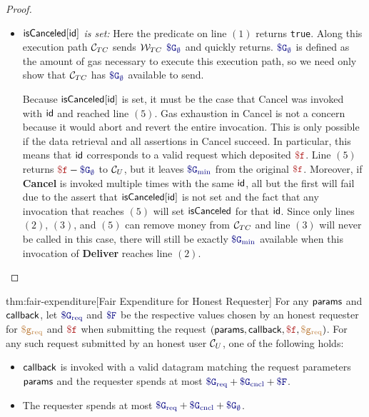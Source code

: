 \begin{proof}
\begin{itemize}
\item {\it ${\sf isCanceled}[{\sf id}]$ is set:}
Here the predicate on line $(1)$ returns {\tt true}.
Along this execution path $\tcont$ sends $\tcadd$ $\constgascancel$ and quickly returns.
$\constgascancel$ is defined as the amount of gas necessary to execute this execution path,
so we need only show that $\tcont$ has $\constgascancel$ available to send.

Because ${\sf isCanceled}[{\sf id}]$ is set, it must be the case that {\sf Cancel} was invoked with ${\sf id}$ and reached line $(5)$.
Gas exhaustion in {\sf Cancel} is not a concern because it would abort and revert the entire invocation.
This is only possible if the data retrieval and all assertions in {\sf Cancel} succeed.
In particular, this means that ${\sf id}$ corresponds to a valid request which deposited $\fee$.
Line $(5)$ returns $\fee - \constgascancel$ to $\reqcont$, but it leaves $\constgasmin$ from the original $\fee$.
Moreover, if {\bf Cancel} is invoked multiple times with the same ${\sf id}$, all but the first will fail due to the assert that ${\sf isCanceled}[{\sf id}]$ is not set
and the fact that any invocation that reaches $(5)$ will set ${\sf isCanceled}$ for that ${\sf id}$.
Since only lines $(2)$, $(3)$, and $(5)$ can remove money from $\tcont$ and line $(3)$ will never be called in this case,
there will still be exactly $\constgasmin$ available when this invocation of {\bf Deliver} reaches line $(2)$.

\end{itemize}
\end{proof}






\begin{retheorem}{thm:fair-expenditure}[Fair Expenditure for Honest Requester]
For any ${\sf params}$ and ${\sf callback}$,
let $\constgasrequest$ and $\consthonestfee$ be the respective values chosen by an honest requester for $\textcolor{brown}{\tt \$g_\text{req}}$ and $\fee$
when submitting the request $(\dgform, \dgcallback, \fee, \gasrequest)$.
For any such request submitted by an honest user $\reqcont$, one of the following holds:
\begin{itemize}
  \setlength{\itemsep}{2pt}
  \setlength{\parskip}{0pt}
  \setlength{\parsep}{0pt}
  \item ${\sf callback}$ is invoked with a valid datagram matching the request parameters ${\sf params}$
    and the requester spends at most $\constgasrequest + \constgasinvokecancel + \consthonestfee$.

  \item The requester spends at most $\constgasrequest + \constgasinvokecancel + \constgascancel$.
\end{itemize}
\end{retheorem}


